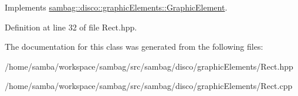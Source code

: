 Implements \hyperlink{classsambag_1_1disco_1_1graphic_elements_1_1_graphic_element_a2e07ce40a1a6a929e87dc291de7addff}{sambag::disco::graphicElements::GraphicElement}.



Definition at line 32 of file Rect.hpp.



The documentation for this class was generated from the following files:\begin{DoxyCompactItemize}
\item 
/home/samba/workspace/sambag/src/sambag/disco/graphicElements/Rect.hpp\item 
/home/samba/workspace/sambag/src/sambag/disco/graphicElements/Rect.cpp\end{DoxyCompactItemize}
